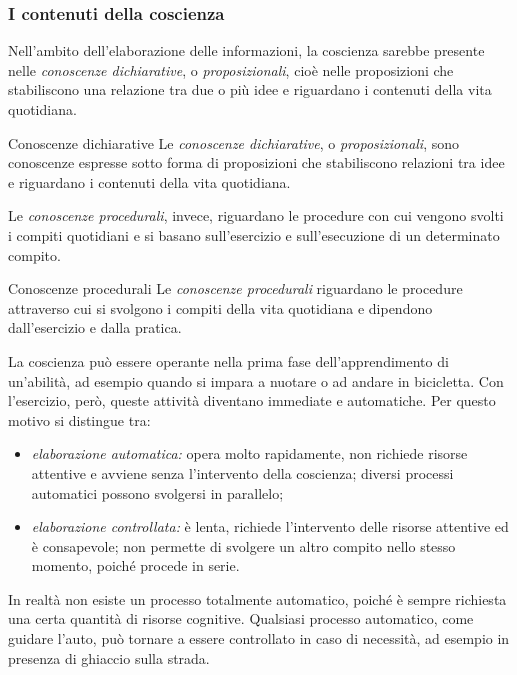 \documentclass[a4paper]{article}
\begin{document}
\subsubsection{I contenuti della coscienza}
Nell'ambito dell'elaborazione delle informazioni, la coscienza sarebbe presente nelle \emph{conoscenze dichiarative}, o \emph{proposizionali}, cioè nelle proposizioni che stabiliscono una relazione tra due o più idee e riguardano i contenuti della vita quotidiana.
\begin{snippetdefinition}{Conoscenze dichiarative}
    Le \emph{conoscenze dichiarative}, o \emph{proposizionali}, sono conoscenze espresse sotto forma di proposizioni che stabiliscono relazioni tra idee e riguardano i contenuti della vita quotidiana.
\end{snippetdefinition}
Le \emph{conoscenze procedurali}, invece, riguardano le procedure con cui vengono svolti i compiti quotidiani e si basano sull'esercizio e sull'esecuzione di un determinato compito.
\begin{snippetdefinition}{Conoscenze procedurali}
    Le \emph{conoscenze procedurali} riguardano le procedure attraverso cui si svolgono i compiti della vita quotidiana e dipendono dall'esercizio e dalla pratica.
\end{snippetdefinition}
La coscienza può essere operante nella prima fase dell'apprendimento di un'abilità, ad esempio quando si impara a nuotare o ad andare in bicicletta. Con l'esercizio, però, queste attività diventano immediate e automatiche.
Per questo motivo si distingue tra:
\begin{itemize}
    \item \emph{elaborazione automatica:} opera molto rapidamente, non richiede risorse attentive e avviene senza l'intervento della coscienza; diversi processi automatici possono svolgersi in parallelo;
    \item \emph{elaborazione controllata:} è lenta, richiede l'intervento delle risorse attentive ed è consapevole; non permette di svolgere un altro compito nello stesso momento, poiché procede in serie.
\end{itemize}
In realtà non esiste un processo totalmente automatico, poiché è sempre richiesta una certa quantità di risorse cognitive. Qualsiasi processo automatico, come guidare l'auto, può tornare a essere controllato in caso di necessità, ad esempio in presenza di ghiaccio sulla strada.
\end{document}

